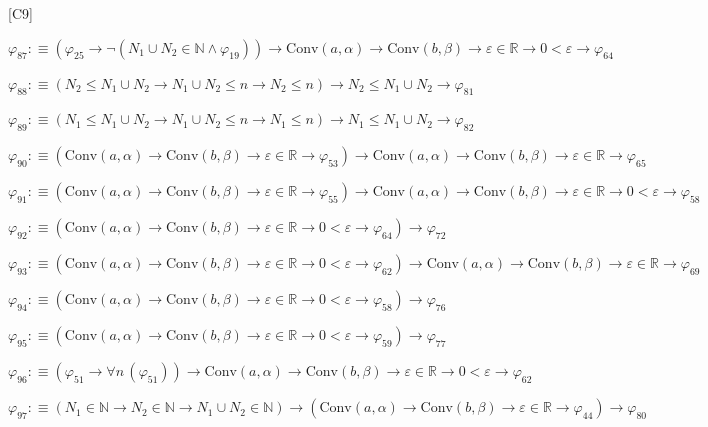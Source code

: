\begin{fullproof}{[C9]}
\begin{abbrevlist}
\item $\varphi_{87} :\equiv (\varphi_{25} \to \neg (N_{1} \cup N_{2} \in \mathbb{N} \land \varphi_{19})) \to \mathrm{Conv}(a,\alpha) \to \mathrm{Conv}(b,\beta) \to \varepsilon \in \mathbb{R} \to 0 < \varepsilon \to \varphi_{64}$
\item $\varphi_{88} :\equiv (N_{2} \leq N_{1} \cup N_{2} \to N_{1} \cup N_{2} \leq n \to N_{2} \leq n) \to N_{2} \leq N_{1} \cup N_{2} \to \varphi_{81}$
\item $\varphi_{89} :\equiv (N_{1} \leq N_{1} \cup N_{2} \to N_{1} \cup N_{2} \leq n \to N_{1} \leq n) \to N_{1} \leq N_{1} \cup N_{2} \to \varphi_{82}$
\item $\varphi_{90} :\equiv (\mathrm{Conv}(a,\alpha) \to \mathrm{Conv}(b,\beta) \to \varepsilon \in \mathbb{R} \to \varphi_{53}) \to \mathrm{Conv}(a,\alpha) \to \mathrm{Conv}(b,\beta) \to \varepsilon \in \mathbb{R} \to \varphi_{65}$
\item $\varphi_{91} :\equiv (\mathrm{Conv}(a,\alpha) \to \mathrm{Conv}(b,\beta) \to \varepsilon \in \mathbb{R} \to \varphi_{55}) \to \mathrm{Conv}(a,\alpha) \to \mathrm{Conv}(b,\beta) \to \varepsilon \in \mathbb{R} \to 0 < \varepsilon \to \varphi_{58}$
\item $\varphi_{92} :\equiv (\mathrm{Conv}(a,\alpha) \to \mathrm{Conv}(b,\beta) \to \varepsilon \in \mathbb{R} \to 0 < \varepsilon \to \varphi_{64}) \to \varphi_{72}$
\item $\varphi_{93} :\equiv (\mathrm{Conv}(a,\alpha) \to \mathrm{Conv}(b,\beta) \to \varepsilon \in \mathbb{R} \to 0 < \varepsilon \to \varphi_{62}) \to \mathrm{Conv}(a,\alpha) \to \mathrm{Conv}(b,\beta) \to \varepsilon \in \mathbb{R} \to \varphi_{69}$
\item $\varphi_{94} :\equiv (\mathrm{Conv}(a,\alpha) \to \mathrm{Conv}(b,\beta) \to \varepsilon \in \mathbb{R} \to 0 < \varepsilon \to \varphi_{58}) \to \varphi_{76}$
\item $\varphi_{95} :\equiv (\mathrm{Conv}(a,\alpha) \to \mathrm{Conv}(b,\beta) \to \varepsilon \in \mathbb{R} \to 0 < \varepsilon \to \varphi_{59}) \to \varphi_{77}$
\item $\varphi_{96} :\equiv (\varphi_{51} \to \forall n\,(\varphi_{51})) \to \mathrm{Conv}(a,\alpha) \to \mathrm{Conv}(b,\beta) \to \varepsilon \in \mathbb{R} \to 0 < \varepsilon \to \varphi_{62}$
\item $\varphi_{97} :\equiv (N_{1} \in \mathbb{N} \to N_{2} \in \mathbb{N} \to N_{1} \cup N_{2} \in \mathbb{N}) \to (\mathrm{Conv}(a,\alpha) \to \mathrm{Conv}(b,\beta) \to \varepsilon \in \mathbb{R} \to \varphi_{44}) \to \varphi_{80}$

\end{abbrevlist}
\end{fullproof}
